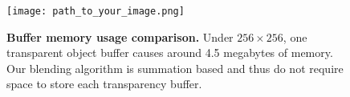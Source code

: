 \begin{figure}[h]
    \centering
    \texttt{[image: path\_to\_your\_image.png]}
    \caption{\textbf{Buffer memory usage comparison.} Under $256 \times 256$, one transparent object buffer causes around 4.5 megabytes of memory. Our blending algorithm is summation based and thus do not require space to store each transparency buffer.}
    \label{fig:buffer_memory_comparison}
\end{figure}